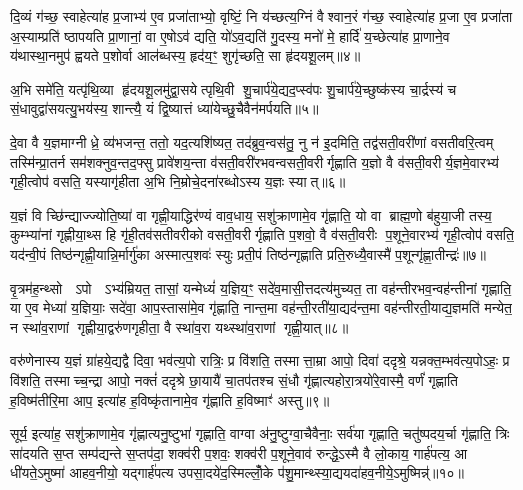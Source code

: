 दि॒व्यं ग॑च्छ॒ स्वाहेत्या॑ह प्र॒जाभ्य॑ ए॒व प्रजा॑ताभ्यो॒ वृष्टिं॒ नि य॑च्छत्य॒ग्निं वैश्वान॒रं ग॑च्छ॒ स्वाहेत्या॑ह प्र॒जा ए॒व प्रजा॑ता अ॒स्याम्प्रति॑ ष्ठापयति प्रा॒णानां॒ वा ए॒षोऽव॑ द्यति॒ यो॑ऽव॒द्यति॑ गु॒दस्य॒ मनो॑ मे॒ हार्दि॑ य॒च्छेत्या॑ह प्रा॒णाने॒व य॑थास्था॒नमुप॑ ह्वयते प॒शोर्वा आल॑ब्धस्य॒ हृद॑य॒ꣳ॒ शुगृ॑च्छति॒ सा हृ॑दयशू॒लम्॥४॥

अ॒भि समे॑ति॒ यत्पृ॑थि॒व्या हृ॑दयशू॒लमु॑द्वा॒सयेत्पृथि॒वी शु॒चार्प॑ये॒द्यद॒प्स्व॑पः शु॒चार्प॑ये॒च्छुष्क॑स्य चा॒र्द्रस्य॑ च सं॒धावुद्वा॑सयत्यु॒भय॑स्य॒ शान्त्यै॒ यं द्वि॒ष्यात्तं ध्या॑येच्छु॒चैवैन॑मर्पयति॥५॥

{\anuvakamend[{रेतो॑ मि॒त्रावरु॑णौ गच्छ॒ स्वाहा॒ नभो॑ हृदयशू॒लन्द्वात्रिꣳ॑शच्च॥१॥}]}

दे॒वा वै य॒ज्ञमाग्नीध्रे॒ व्य॑भजन्त॒ ततो॒ यद॒त्यशि॑ष्यत॒ तद॑ब्रुव॒न्वस॑तु॒ नु न॑ इ॒दमिति॒ तद्व॑सती॒वरी॑णां वसतीवरि॒त्वम् तस्मि॑न्प्रा॒तर्न सम॑शक्नुव॒न्तद॒फ्सु प्रावे॑शय॒न्ता व॑सती॒वरी॑रभवन्वसती॒वरीर्गृह्णाति य॒ज्ञो वै व॑सती॒वरीर्य॒ज्ञमे॒वारभ्य॑ गृही॒त्वोप॑ वसति॒ यस्यागृ॑हीता अ॒भि नि॒म्रोचे॒दना॑रब्धोऽस्य य॒ज्ञः स्यात्॥६॥

य॒ज्ञं वि च्छि॑न्द्याज्ज्योति॒ष्या॑ वा गृह्णी॒याद्धिर॑ण्यं वाव॒धाय॒ सशु॑क्राणामे॒व गृ॑ह्णाति॒ यो वा ब्राह्म॒णो ब॑हुया॒जी तस्य॒ कुम्भ्या॑नां गृह्णीया॒थ्स हि गृ॑ही॒तव॑सतीवरीको वसती॒वरीर्गृह्णाति प॒शवो॒ वै व॑सती॒वरीः प॒शूने॒वारभ्य॑ गृही॒त्वोप॑ वसति॒ यद॑न्वी॒पं तिष्ठ॑न्गृह्णी॒यान्नि॒र्मार्गु॑का अस्मात्प॒शवः॑ स्युः प्रती॒पं तिष्ठ॑न्गृह्णाति प्रति॒रुध्यै॒वास्मै॑ प॒शून्गृ॑ह्णा॒तीन्द्रः॑॥७॥

वृ॒त्रम॑ह॒न्थ्सो  ऽपो  ऽभ्य॑म्रियत॒ तासां॒ यन्मेध्यं॑ य॒ज्ञिय॒ꣳ॒ सदे॑व॒मासी॒त्तदत्य॑मुच्यत॒ ता वह॑न्तीरभव॒न्वह॑न्तीनां गृह्णाति॒ या ए॒व मेध्या॑ य॒ज्ञियाः॒ सदे॑वा॒ आप॒स्तासा॑मे॒व गृ॑ह्णाति॒ नान्त॒मा वह॑न्ती॒रती॑या॒द्यद॑न्त॒मा वह॑न्तीरती॒याद्य॒ज्ञमति॑ मन्येत॒ न स्था॑व॒राणां गृह्णीया॒द्वरु॑णगृहीता॒ वै स्था॑व॒रा यथ्स्था॑व॒राणां गृह्णी॒यात्॥८॥

वरु॑णेनास्य य॒ज्ञं ग्रा॑हये॒द्यद्वै दिवा॒ भव॑त्य॒पो रात्रिः॒ प्र वि॑शति॒ तस्मात्ता॒म्रा आपो॒ दिवा॑ ददृश्रे॒ यन्नक्त॒म्भव॑त्य॒पोऽहः॒ प्र वि॑शति॒ तस्माच्च॒न्द्रा आपो॒ नक्तं॑ ददृश्रे छा॒यायै॑ चा॒तप॑तश्च सं॒धौ गृ॑ह्णात्यहोरा॒त्रयो॑रे॒वास्मै॒ वर्णं॑ गृह्णाति ह॒विष्म॑तीरि॒मा आप॒ इत्या॑ह ह॒विष्कृ॑तानामे॒व गृ॑ह्णाति ह॒विष्माꣳ॑ अस्तु॥९॥

सूर्य॒ इत्या॑ह॒ सशु॑क्राणामे॒व गृ॑ह्णात्यनु॒ष्टुभा॑ गृह्णाति॒ वाग्वा अ॑नु॒ष्टुग्वा॒चैवैनाः॒ सर्व॑या गृह्णाति॒ चतु॑ष्पदय॒र्चा गृ॑ह्णाति॒ त्रिः सा॑दयति स॒प्त सम्प॑द्यन्ते स॒प्तप॑दा॒ शक्व॑री प॒शवः॒ शक्व॑री प॒शूने॒वाव॑ रुन्द्धे॒ऽस्मै वै लो॒काय॒ गार्\mbox{}ह॑पत्य॒ आ धी॑यते॒ऽमुष्मा॑ आहव॒नीयो॒ यद्गार्\mbox{}ह॑पत्य उपसा॒दये॑द॒स्मिल्लोँ॒के प॑शु॒मान्थ्स्या॒द्ययदा॑हव॒नीये॒ऽमुष्मिन्न्॑॥१०॥

